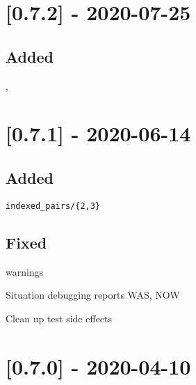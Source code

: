\section{[0.7.2] - 2020-07-25}

\subsection{Added}

\begin{shortlist}
    \item {}
    \item {}
    \item {}
    \item {}, 
\end{shortlist}

\section{[0.7.1] - 2020-06-14}

\subsection{Added}

\begin{shortlist}
    \item \verb$indexed_pairs/{2,3}$
    \item {}
    \item {}
    \item {}
\end{shortlist}

\subsection{Fixed}

\begin{shortlist}
    \item {} warnings
    \item Situation debugging reports WAS, NOW
    \item Clean up test side effects
\end{shortlist}

\section{[0.7.0] - 2020-04-10}

